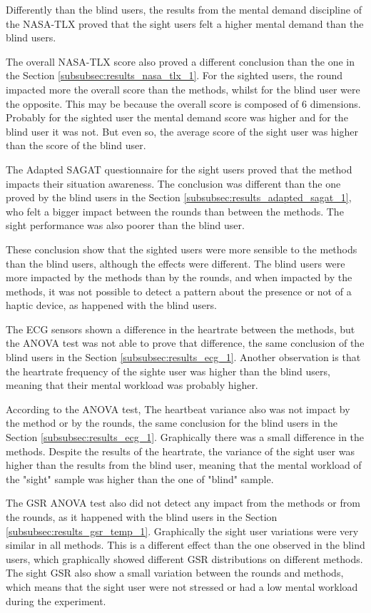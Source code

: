 Differently than the blind users, the results from the mental demand discipline of the NASA-TLX proved that the sight users felt a higher mental demand than the blind users. 

The overall NASA-TLX score also proved a different conclusion than the one in the Section \ref{subsubsec:results_nasa_tlx_1}. For the sighted users, the round impacted more the overall score than the methods, whilst for the blind user were the opposite. This may be because the overall score is composed of 6 dimensions. Probably for the sighted user the mental demand score was higher and for the blind user it was not. But even so, the average score of the sight user was higher than the score of the blind user.

The Adapted SAGAT questionnaire for the sight users proved that the method impacts their situation awareness. The conclusion was different than the one proved by the blind users in the Section \ref{subsubsec:results_adapted_sagat_1}, who felt a bigger impact between the rounds than between the methods. The sight performance was also poorer than the blind user.

These conclusion show that the sighted users were more sensible to the methods than the blind users, although the effects were different. The blind users were more impacted by the methods than by the rounds, and when impacted by the methods, it was not possible to detect a pattern about the presence or not of a haptic device, as happened with the blind users.

The ECG sensors shown a difference in the heartrate between the methods, but the ANOVA test was not able to prove that difference, the same conclusion of the blind users in the Section \ref{subsubsec:results_ecg_1}. Another observation is that the heartrate frequency of the sighte user was higher than the blind users, meaning that their mental workload was probably higher.

According to the ANOVA test, The heartbeat variance also was not impact by the method or by the rounds, the same conclusion for the blind users in the Section \ref{subsubsec:results_ecg_1}. Graphically there was a small difference in the methods. Despite the results of the heartrate, the variance of the sight user was higher than the results from the blind user, meaning that the mental workload of the "sight" sample was higher than the one of "blind" sample.

The GSR ANOVA test also did not detect any impact from the methods or from the rounds, as it happened with the blind users in the Section \ref{subsubsec:results_gsr_temp_1}. Graphically the sight user variations were very similar in all methods. This is a different effect than the one observed in the blind users, which graphically showed different GSR distributions on different methods. The sight GSR also show a small variation between the rounds and methods, which means that the sight user were not stressed or had a low mental workload during the experiment.

